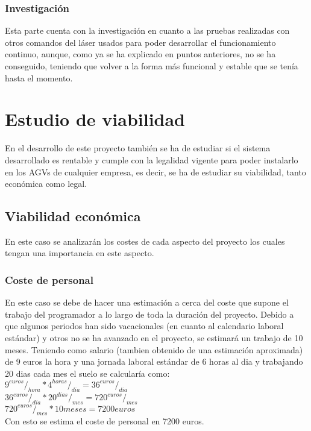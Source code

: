 \subsubsection{Investigación}
Esta parte cuenta con la investigación en cuanto a las pruebas realizadas con otros comandos del láser usados para poder desarrollar el funcionamiento continuo, aunque, como ya se ha explicado en puntos anteriores, no se ha conseguido, teniendo que volver a la forma más funcional y estable que se tenía hasta el momento.

\section{Estudio de viabilidad}
En el desarrollo de este proyecto también se ha de estudiar si el sistema desarrollado es rentable y cumple con la legalidad vigente para poder instalarlo en los AGVs de cualquier empresa, es decir, se ha de estudiar su viabilidad, tanto económica como legal.\\

\subsection{Viabilidad económica}
En este caso se analizarán los costes de cada aspecto del proyecto los cuales tengan una importancia en este aspecto.

\subsubsection{Coste de personal}
En este caso se debe de hacer una estimación a cerca del coste que supone el trabajo del programador a lo largo de toda la duración del proyecto. Debido a que algunos periodos han sido vacacionales (en cuanto al calendario laboral estándar) y otros no se ha avanzado en el proyecto, se estimará un trabajo de 10 meses. Teniendo como salario (tambien obtenido de una estimación aproximada) de 9 euros la hora y una jornada laboral estándar de 6 horas al dia y trabajando 20 dias cada mes el suelo se calcularía como: \\
$9 ^{euros}/_{hora} * 4 ^{horas}/_{dia} = 36 ^{euros}/_{dia}$ \\
$36 ^{euros}/_{dia} * 20 ^{dias}/_{mes} = 720 ^{euros}/_{mes}$ \\
$720 ^{euros}/_{mes} * 10 meses = 7200 euros$ \\
Con esto se estima el coste de personal en 7200 euros.\\

